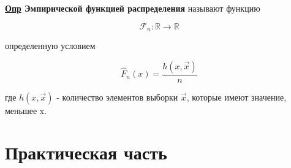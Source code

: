 \documentclass[12pt, a4paper]{report}
\begin{document}
	\textbf{\underline{Опр} Эмпирической функцией распределения} называют функцию
	
	\begin{equation*}
	\mathcal{F}_n: \mathbb{R} \to \mathbb{R}
	\end{equation*}
	
	\hspace{1cm} определенную условием
	
	\begin{equation*}
		\hat F_n(x) = \frac{h(x, \vec{x})}{n}
	\end{equation*}
	
	где $h(x, \vec{x})$  - количество элементов выборки $\vec{x}$, которые имеют значение, меньшее x.
	
	\newpage
	
	\section{Практическая часть}
	
\end{document}
